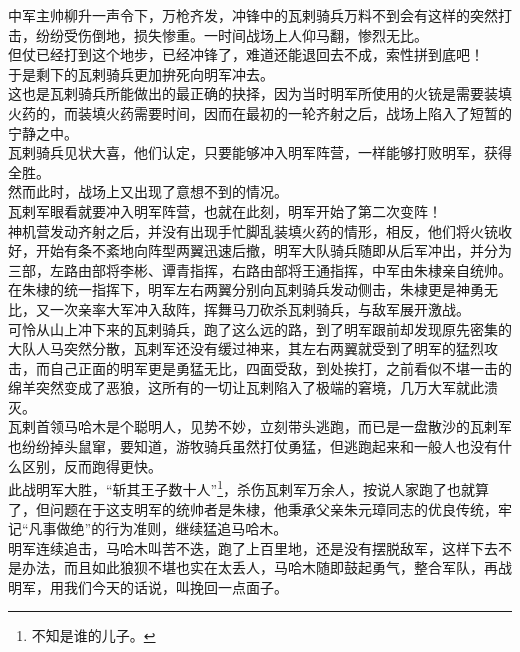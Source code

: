 \begin{multicols}{\theparacolNo}
中军主帅柳升一声令下，万枪齐发，冲锋中的瓦剌骑兵万料不到会有这样的突然打击，纷纷受伤倒地，损失惨重。一时间战场上人仰马翻，惨烈无比。\\

但仗已经打到这个地步，已经冲锋了，难道还能退回去不成，索性拼到底吧！\\

于是剩下的瓦剌骑兵更加拚死向明军冲去。\\

这也是瓦剌骑兵所能做出的最正确的抉择，因为当时明军所使用的火铳是需要装填火药的，而装填火药需要时间，因而在最初的一轮齐射之后，战场上陷入了短暂的宁静之中。\\

瓦剌骑兵见状大喜，他们认定，只要能够冲入明军阵营，一样能够打败明军，获得全胜。\\

然而此时，战场上又出现了意想不到的情况。\\

瓦剌军眼看就要冲入明军阵营，也就在此刻，明军开始了第二次变阵！\\

神机营发动齐射之后，并没有出现手忙脚乱装填火药的情形，相反，他们将火铳收好，开始有条不紊地向阵型两翼迅速后撤，明军大队骑兵随即从后军冲出，并分为三部，左路由部将李彬、谭青指挥，右路由部将王通指挥，中军由朱棣亲自统帅。\\

在朱棣的统一指挥下，明军左右两翼分别向瓦剌骑兵发动侧击，朱棣更是神勇无比，又一次亲率大军冲入敌阵，挥舞马刀砍杀瓦剌骑兵，与敌军展开激战。\\

可怜从山上冲下来的瓦剌骑兵，跑了这么远的路，到了明军跟前却发现原先密集的大队人马突然分散，瓦剌军还没有缓过神来，其左右两翼就受到了明军的猛烈攻击，而自己正面的明军更是勇猛无比，四面受敌，到处挨打，之前看似不堪一击的绵羊突然变成了恶狼，这所有的一切让瓦剌陷入了极端的窘境，几万大军就此溃灭。\\

瓦剌首领马哈木是个聪明人，见势不妙，立刻带头逃跑，而已是一盘散沙的瓦剌军也纷纷掉头鼠窜，要知道，游牧骑兵虽然打仗勇猛，但逃跑起来和一般人也没有什么区别，反而跑得更快。\\

此战明军大胜，“斩其王子数十人”\footnote{不知是谁的儿子。}，杀伤瓦剌军万余人，按说人家跑了也就算了，但问题在于这支明军的统帅者是朱棣，他秉承父亲朱元璋同志的优良传统，牢记“凡事做绝”的行为准则，继续猛追马哈木。\\

明军连续追击，马哈木叫苦不迭，跑了上百里地，还是没有摆脱敌军，这样下去不是办法，而且如此狼狈不堪也实在太丢人，马哈木随即鼓起勇气，整合军队，再战明军，用我们今天的话说，叫挽回一点面子。\\


\end{multicols}
